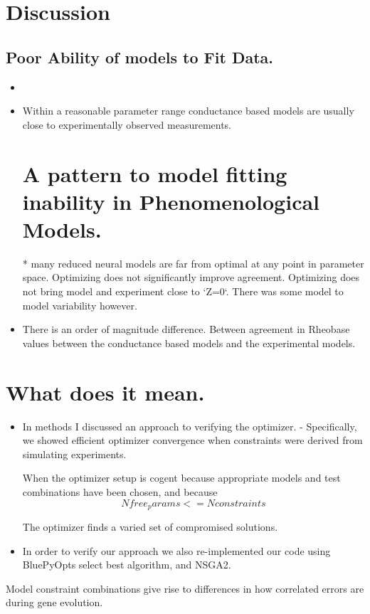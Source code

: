 \section{Discussion}

\subsection{Poor Ability of models to Fit Data.}
\begin{itemize}

Final list of tests used: RheobaseTest, InputResistanceTest, TimeConstantTest, CapacitanceTest, RestingPotentialTest.
\item 
\item Within a reasonable parameter range conductance based models are usually close to experimentally observed measurements.

\section{A pattern to model fitting inability in Phenomenological Models.}
* many reduced neural models are far from optimal at any point in parameter space. Optimizing does not significantly improve agreement. Optimizing does not bring model and experiment close to `Z=0`. There was some model to model variability however.

\item There is an order of magnitude difference. Between agreement in Rheobase values between the conductance based models and the experimental models. 

\end{itemize}

\section{What does it mean.}
\begin{itemize}

\item  In methods I discussed an approach to verifying the optimizer.
- Specifically, we showed efficient optimizer convergence when constraints were derived from simulating experiments.

When the optimizer setup is cogent because appropriate models and test combinations have been chosen, and because 
\begin{equation}

N free_params <= N constraints
\end{equation}

The optimizer finds a varied set of compromised solutions.

\item  In order to verify our approach we also re-implemented our code using BluePyOpts select best algorithm, and NSGA2.
\end{itemize}

Model constraint combinations give rise to differences in how correlated errors are during gene evolution. 